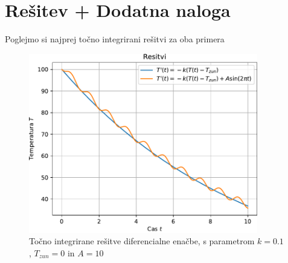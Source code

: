 \section{Rešitev + Dodatna naloga}

Poglejmo si najprej točno integrirani rešitvi za oba primera
\begin{figure}[h]
    \centering
    \includegraphics[width=10cm]{pdfs/ress.pdf}
    \caption{Točno integrirane rešitve diferencialne enačbe, s parametrom $k=0.1$, $T_{zun}=0$ in $A = 10$ }
\end{figure}

